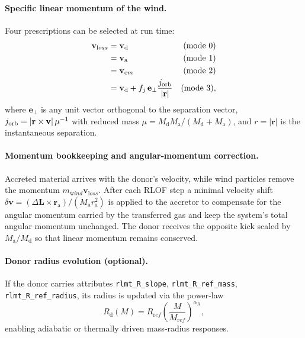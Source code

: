 \documentclass[11pt]{article}
\begin{document}
\paragraph{Specific linear momentum of the wind.}
Four prescriptions can be selected at run time:
\begin{subequations}\label{eq:joptions}
\begin{align}
\mathbf v_{\mathrm loss} &= \mathbf v_{\mathrm d} & (\text{mode }0)\\
                         &= \mathbf v_{\mathrm a} & (\text{mode }1)\\
                         &= \mathbf v_{\mathrm cm}& (\text{mode }2)\\
                         &= \mathbf v_{\mathrm d} + f_j\,\mathbf e_\perp
                            \frac{j_{\rm orb}}{\lvert\mathbf r\rvert} & (\text{mode }3),
\end{align}
\end{subequations}
where $\mathbf e_\perp$ is any unit vector orthogonal to the separation
vector, $j_{\rm orb}=|\mathbf r\times\mathbf v|\,\mu^{-1}$ with reduced mass
$\mu=M_{\mathrm d}M_{\mathrm a}/(M_{\mathrm d}+M_{\mathrm a})$, and
$r=|\mathbf r|$ is the instantaneous separation.

\paragraph{Momentum bookkeeping and angular‑momentum correction.}
Accreted material arrives with the donor’s velocity, while wind
particles remove the momentum $m_{\mathrm wind}\mathbf v_{\mathrm loss}$.
After each RLOF step a minimal
velocity shift
\(
\delta\mathbf v=(\Delta\mathbf L\times\mathbf r_{\mathrm a})/(M_{\mathrm a}r_{\mathrm a}^2)
\)
is applied to the accretor to compensate for the angular momentum carried by
the transferred gas and keep the system’s total angular momentum unchanged.
The donor receives the opposite kick scaled by $M_{\mathrm a}/M_{\mathrm d}$ so
that linear momentum remains conserved.

\paragraph{Donor radius evolution (optional).}
If the donor carries attributes
\texttt{rlmt\_R\_slope}, \texttt{rlmt\_R\_ref\_mass},
\texttt{rlmt\_R\_ref\_radius}, its radius is updated via the power‑law
\[
R_{\mathrm d}(M)=R_{\mathrm ref}
\left(\frac{M}{M_{\mathrm ref}}\right)^{\alpha_R},
\]
enabling adiabatic or thermally driven mass‑radius responses.
\end{document}
